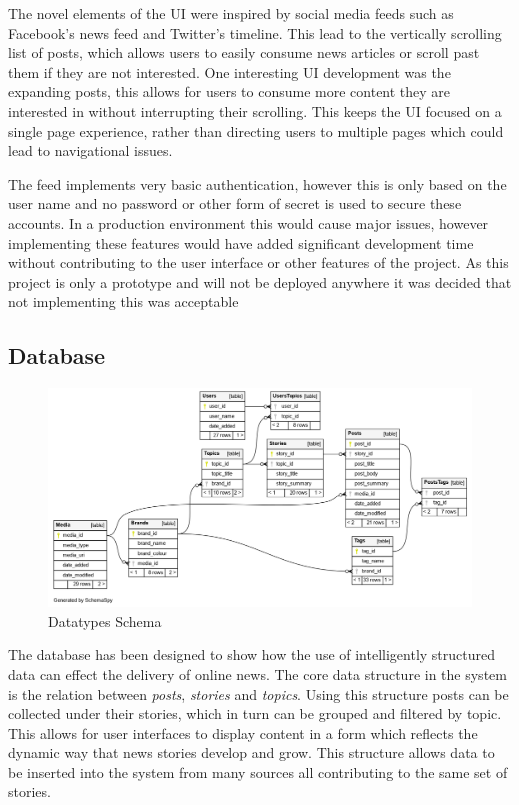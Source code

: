 \documentclass[12pt,titlepage]{article}
\begin{document}
  The novel elements of the UI were inspired by social media feeds such as
  Facebook's news feed and Twitter's timeline. This lead to the vertically
  scrolling list of posts, which allows users to easily consume news articles or
  scroll past them if they are not interested. One interesting UI development
  was the expanding posts, this allows for users to consume more content they
  are interested in without interrupting their scrolling. This keeps the UI
  focused on a single page experience, rather than directing users to multiple
  pages which could lead to navigational issues.

  The feed implements very basic authentication, however this is only based on
  the user name and no password or other form of secret is used to secure these
  accounts. In a production environment this would cause major issues, however
  implementing these features would have added significant development time
  without contributing to the user interface or other features of the project.
  As this project is only a prototype and will not be deployed anywhere it was
  decided that not implementing this was acceptable

  \subsection{Database}

  \begin{figure}
    \centering
    \includegraphics[width=\textwidth]{../img/dbschema.png}
    \caption{Datatypes Schema}
    \label{fig:schema}
  \end{figure}

  The database has been designed to show how the use of intelligently structured
  data can effect the delivery of online news. The core data structure in the
  system is the relation between \textit{posts}, \textit{stories} and
  \textit{topics}. Using this structure posts can be collected under their
  stories, which in turn can be grouped and filtered by topic. This allows for
  user interfaces to display content in a form which reflects the dynamic way
  that news stories develop and grow. This structure allows data to be inserted
  into the system from many sources all contributing to the same set of stories.
\end{document}
